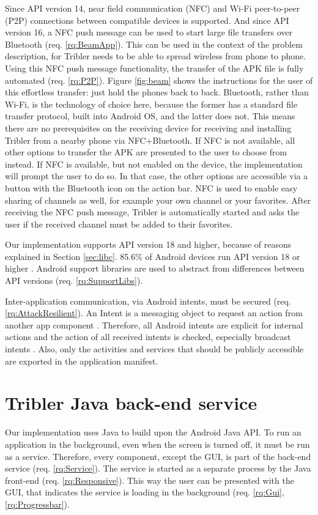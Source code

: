 Since API version 14, near field communication (NFC) and Wi-Fi peer-to-peer (P2P) connections between compatible devices is supported.
And since API version 16, a NFC push message can be used to start large file transfers over Bluetooth (req. \ref{rq:BeamApp}).
This can be used in the context of the problem description, for Tribler needs to be able to spread wireless from phone to phone.
Using this NFC push message functionality, the transfer of the APK file is fully automated (req. \ref{rq:P2P}).
Figure \ref{fig:beam} shows the instructions for the user of this effortless transfer: just hold the phones back to back.
Bluetooth, rather than Wi-Fi, is the technology of choice here, because the former has a standard file transfer protocol, built into Android OS, and the latter does not.
This means there are no prerequisites on the receiving device for receiving and installing Tribler from a nearby phone via NFC+Bluetooth.
If NFC is not available, all other options to transfer the APK are presented to the user to choose from instead.
If NFC is available, but not enabled on the device, the implementation will prompt the user to do so.
In that case, the other options are accessible via a button with the Bluetooth icon on the action bar.
NFC is used to enable easy sharing of channels as well, for example your own channel or your favorites.
After receiving the NFC push message, Tribler is automatically started and asks the user if the received channel must be added to their favorites.

Our implementation supports API version 18 and higher, because of reasons explained in Section \ref{sec:libc}.
85.6\% of Android devices run API version 18 or higher \cite{android-dashboard}.
Android support libraries are used to abstract from differences between API versions (req. \ref{rq:SupportLibs}).

Inter-application communication, via Android intents, must be secured (req. \ref{rq:AttackResilient}).
An Intent is a messaging object to request an action from another app component \cite{android-intents}.
Therefore, all Android intents are explicit for internal actions and the action of all received intents is checked, especially broadcast intents \cite{intent-secure}.
Also, only the activities and services that should be publicly accessible are exported in the application manifest.


\section{Tribler Java back-end service}
Our implementation uses Java to build upon the Android Java API.
To run an application in the background, even when the screen is turned off, it must be run as a service.
Therefore, every component, except the GUI, is part of the back-end service (req. \ref{rq:Service}).
The service is started as a separate process by the Java front-end (req. \ref{rq:Responsive}).
This way the user can be presented with the GUI, that indicates the service is loading in the background (req. \ref{rq:Gui}, \ref{rq:Progressbar}).

